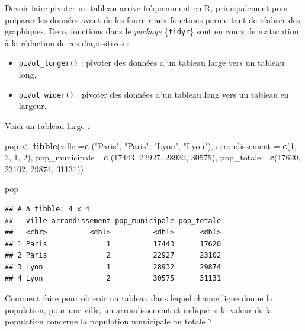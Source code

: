 \documentclass[
  11pt,
]{book}
\newenvironment{Shaded}{\begin{snugshade}}{\end{snugshade}}
\newcommand{\DataTypeTok}[1]{\textcolor[rgb]{0.13,0.29,0.53}{#1}}
\newcommand{\DecValTok}[1]{\textcolor[rgb]{0.00,0.00,0.81}{#1}}
\newcommand{\KeywordTok}[1]{\textcolor[rgb]{0.13,0.29,0.53}{\textbf{#1}}}
\newcommand{\NormalTok}[1]{#1}
\newcommand{\StringTok}[1]{\textcolor[rgb]{0.31,0.60,0.02}{#1}}
\providecommand{\tightlist}{%
  \setlength{\itemsep}{0pt}\setlength{\parskip}{0pt}}
\numberwithin{equation}{section}
\numberwithin{countremarque}{section}
\begin{document}
Devoir faire pivoter un tableau arrive fréquemment en R, principalement pour préparer les données avant de les fournir aux fonctions permettant de réaliser des graphiques. Deux fonctions dans le \emph{package} \{\texttt{tidyr}\} sont en cours de maturation à la rédaction de ces diapositives :

\begin{itemize}
\tightlist
\item
  \texttt{pivot\_longer()} : pivoter des données d'un tableau large vers un tableau long,
\item
  \texttt{pivot\_wider()} : pivoter des données d'un tableau long vers un tableau en largeur.
\end{itemize}

Voici un tableau large :

\begin{Shaded}
\begin{Highlighting}[]
\NormalTok{pop \textless{}{-}}
\StringTok{  }\KeywordTok{tibble}\NormalTok{(}\DataTypeTok{ville =}\KeywordTok{c}\NormalTok{ (}\StringTok{"Paris"}\NormalTok{, }\StringTok{"Paris"}\NormalTok{, }\StringTok{"Lyon"}\NormalTok{, }\StringTok{"Lyon"}\NormalTok{),}
         \DataTypeTok{arrondissement =} \KeywordTok{c}\NormalTok{(}\DecValTok{1}\NormalTok{, }\DecValTok{2}\NormalTok{, }\DecValTok{1}\NormalTok{, }\DecValTok{2}\NormalTok{),}
         \DataTypeTok{pop\_municipale =}\KeywordTok{c}\NormalTok{ (}\DecValTok{17443}\NormalTok{, }\DecValTok{22927}\NormalTok{, }\DecValTok{28932}\NormalTok{, }\DecValTok{30575}\NormalTok{),}
         \DataTypeTok{pop\_totale =}\KeywordTok{c}\NormalTok{(}\DecValTok{17620}\NormalTok{, }\DecValTok{23102}\NormalTok{, }\DecValTok{29874}\NormalTok{, }\DecValTok{31131}\NormalTok{))}

\NormalTok{pop}
\end{Highlighting}
\end{Shaded}

\begin{lstlisting}
## # A tibble: 4 x 4
##   ville arrondissement pop_municipale pop_totale
##   <chr>          <dbl>          <dbl>      <dbl>
## 1 Paris              1          17443      17620
## 2 Paris              2          22927      23102
## 3 Lyon               1          28932      29874
## 4 Lyon               2          30575      31131
\end{lstlisting}

Comment faire pour obtenir un tableau dans lequel chaque ligne donne la population, pour une ville, un arrondissement et indique si la valeur de la population concerne la population municipale ou totale ?
\end{document}
